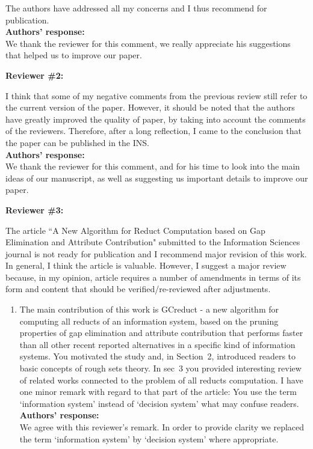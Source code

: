 \documentclass{letter}
\begin{document}
\begin{letter}{}
  The authors have addressed all my concerns and I thus recommend for publication.\\
  \textbf{Authors’ response:} \\
  We thank the reviewer for this comment, we really appreciate his suggestions that helped us to improve our paper.
  
  \textbf{Reviewer \#2:}
  
  I think that some of my negative comments from the previous review still refer to the current version of the paper. However, it should be noted that the authors have greatly improved the quality of paper, by taking into account the comments of the reviewers. Therefore, after a long reflection, I came to the conclusion that the paper can be published in the INS.\\
  \textbf{Authors’ response:} \\
  We thank the reviewer for this comment, and for his time to look into the main ideas of our manuscript, as well as suggesting us important details to improve our paper.
  
  \textbf{Reviewer \#3:}
  
  The article ``A New Algorithm for Reduct Computation based on Gap Elimination and Attribute Contribution" submitted to the Information Sciences journal is not ready for publication and I recommend major revision of this work. In general, I think the article is valuable. However, I suggest a major review because, in my opinion, article requires a number of amendments in terms of its form and content that should be verified/re-reviewed after adjustments.
 
 \begin{enumerate}  
	\item The main contribution of this work is GCreduct - a new algorithm for computing all reducts of an information system, based on the pruning properties of gap elimination and attribute contribution that performs faster than all other recent reported alternatives in a specific kind of information systems. You motivated the study and, in Section~2, introduced readers to basic concepts of rough sets theory. In sec~3 you provided interesting review of related works connected to the problem of all reducts computation. I have one minor remark with regard to that part of the article: You use the term `information system' instead of `decision system' what may confuse readers.\\
	\textbf{Authors’ response:} \\
	We agree with this reviewer's remark. In order to provide clarity we replaced the term `information system' by `decision system' where appropriate.
	

\end{enumerate}
\end{letter}
\end{document}
